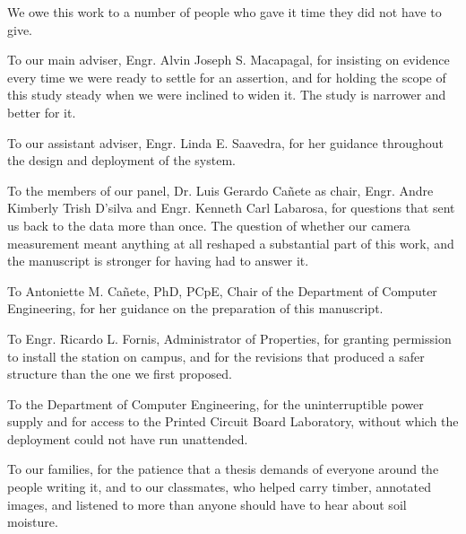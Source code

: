 
\begin{acknowledgments}
\setlength{\parindent}{0pt}
\setlength{\parskip}{\baselineskip}

We owe this work to a number of people who gave it time they did not have to
give.

To our main adviser, Engr. Alvin Joseph S. Macapagal, for insisting on
evidence every time we were ready to settle for an assertion, and for holding
the scope of this study steady when we were inclined to widen it. The study is
narrower and better for it.

To our assistant adviser, Engr. Linda E. Saavedra, for her guidance throughout
the design and deployment of the system.

To the members of our panel, Dr. Luis Gerardo Ca\~{n}ete as chair,
Engr. Andre Kimberly Trish D'silva and Engr. Kenneth Carl Labarosa, for
questions that sent us back to the data more than once. The question of
whether our camera measurement meant anything at all reshaped a substantial
part of this work, and the manuscript is stronger for having had to answer it.

To Antoniette M. Ca\~{n}ete, PhD, PCpE, Chair of the Department of Computer
Engineering, for her guidance on the preparation of this manuscript.

To Engr. Ricardo L. Fornis, Administrator of Properties, for granting
permission to install the station on campus, and for the revisions that
produced a safer structure than the one we first proposed.

To the Department of Computer Engineering, for the uninterruptible power
supply and for access to the Printed Circuit Board Laboratory, without which
the deployment could not have run unattended.

To our families, for the patience that a thesis demands of everyone around
the people writing it, and to our classmates, who helped carry timber,
annotated images, and listened to more than anyone should have to hear about
soil moisture.

\end{acknowledgments}
